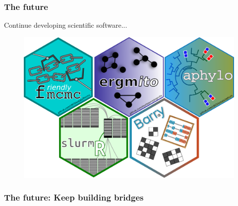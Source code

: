 \documentclass[aspectratio=169,9pt,handout]{beamer}
\begin{document}
\begin{frame}
	\frametitle{The future}
	\Large Continue developing scientific software... \normalsize
	\begin{figure}
		\includegraphics[width=.65\linewidth]{fig-packages/hexlogos.png}
	\end{figure}
\end{frame}

\begin{frame}
	\frametitle{The future: Keep building bridges}
	
\hfill {}\normalsize
\end{frame}

%	
\end{document}

